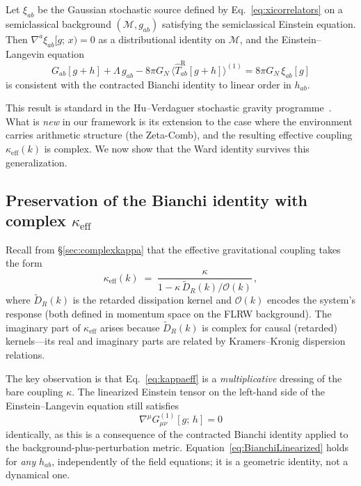 \documentclass[12pt,a4paper]{article}
\begin{document}
\begin{tcolorbox}[colback=gray!5, colframe=black!50, title={Theorem 1 (Stochastic conservation)}]
Let $\xi_{ab}$ be the Gaussian stochastic source defined by
Eq.~\eqref{eq:xicorrelators} on a semiclassical background
$({\mathcal M}, g_{ab})$ satisfying the semiclassical Einstein equation.
Then $\nabla^a \xi_{ab}[g;\,x) = 0$ as a distributional identity on
$\mathcal{M}$, and the Einstein--Langevin equation
\begin{equation}
  G_{ab}[g+h]
  + \Lambda\, g_{ab}
  - 8\pi G_N\,
  \bigl\langle \hat{T}^{\mathrm{R}}_{ab}[g+h]\bigr\rangle^{(1)}
  = 8\pi G_N\, \xi_{ab}[g]
  \label{eq:EinsteinLangevin}
\end{equation}
is consistent with the contracted Bianchi identity to linear order
in $h_{ab}$.
\end{tcolorbox}

\noindent
This result is standard in the Hu--Verdaguer stochastic gravity
programme~\cite{HuVerdaguer2004,HuVerdaguer2008,CalzettaHu2008}.
What is \emph{new} in our framework is its extension to the case where
the environment carries arithmetic structure (the Zeta-Comb), and the
resulting effective coupling $\kappa_{\mathrm{eff}}(k)$ is complex.
We now show that the Ward identity survives this generalization.

\subsection{Preservation of the Bianchi identity with complex $\kappa_{\mathrm{eff}}$}
\label{subsec:bianchi}

Recall from \S\ref{sec:complexkappa} that the effective gravitational
coupling takes the form
%
\begin{equation}
  \kappa_{\mathrm{eff}}(k)
  \;=\;
  \frac{\kappa}{1 - \kappa\,
    \widetilde{D}_{\!R}(k)\big/\mathcal{O}(k)}\,,
  \label{eq:kappaeff}
\end{equation}
%
where $\widetilde{D}_{\!R}(k)$ is the retarded dissipation kernel and
$\mathcal{O}(k)$ encodes the system's response (both defined in
momentum space on the FLRW background).  The imaginary part of
$\kappa_{\mathrm{eff}}$ arises because $\widetilde{D}_{\!R}(k)$ is
complex for causal (retarded) kernels---its real and imaginary parts
are related by Kramers--Kronig dispersion relations.

The key observation is that Eq.~\eqref{eq:kappaeff} is a
\emph{multiplicative} dressing of the bare coupling $\kappa$.
The linearized Einstein tensor on the left-hand side of the
Einstein--Langevin equation still satisfies
%
\begin{equation}
  \nabla^\mu G^{(1)}_{\mu\nu}[g;\, h] = 0
  \label{eq:BianchiLinearized}
\end{equation}
%
identically, as this is a consequence of the contracted Bianchi
identity applied to the background-plus-perturbation metric.
Equation~\eqref{eq:BianchiLinearized} holds for \emph{any} $h_{ab}$,
independently of the field equations; it is a geometric identity,
not a dynamical one.
\end{document}
